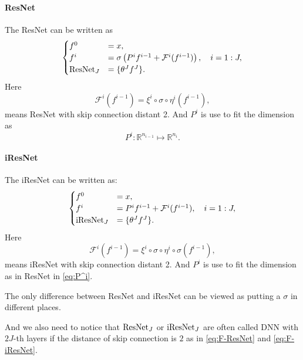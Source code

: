 \paragraph{ResNet}
The ResNet can be written as
\begin{equation}\label{ori-ResNet-dnn}
\begin{cases}
f^0 &= x, \\
f^{i} &= \sigma \left( P^i f^{i-1} + \mathcal{F}^{ i} (f^{i-1}) \right), \quad i = 1:J ,\\
{\rm ResNet}_{J} &= \{  \theta^J f^{J} \}.
\end{cases}
\end{equation}
Here
\begin{equation}\label{eq:F-ResNet}
\mathcal{F}^{i} (f^{i-1}) = \xi^{i} \circ \sigma \circ \eta^{i} (f^{i-1}),
\end{equation}
means ResNet with skip connection distant 2. And $P^i$ is use to fit the dimension as
\begin{equation}\label{eq:P^i}
P^i: \mathbb{R}^{n_{i-1}} \mapsto \mathbb{R}^{n_i}.
\end{equation}

\paragraph{iResNet} 
The iResNet can be written as:
\begin{equation}\label{ori-iResNet-dnn}
\begin{cases}
f^0 &= x, \\
f^{i} &=  P^i f^{i-1} + \mathcal{F}^{ i} (f^{i-1}) , \quad i = 1:J ,\\
{\rm iResNet}_{J} &= \{  \theta^J f^{J} \}.
\end{cases}
\end{equation}
Here
\begin{equation}\label{eq:F-iResNet}
\mathcal{F}^{i} (f^{i-1}) = \xi^{i} \circ \sigma \circ \eta^{i}  \circ \sigma (f^{i-1}),
\end{equation}
means iResNet with skip connection distant 2. 
And $P^i$ is use to fit the dimension as in ResNet in \eqref{eq:P^i}.

The only difference between ResNet and iResNet can be viewed as 
putting a $\sigma$ in different places. 

And we also need to notice that ${\rm ResNet}_J$ or  ${\rm iResNet}_J$
are often called DNN with $2J$-th layers if the distance of skip connection
is $2$ as in \eqref{eq:F-ResNet} and \eqref{eq:F-iResNet}.

